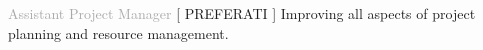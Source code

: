 



\begin{cvtable}


{\textcolor{darkgray}{Assistant Project Manager}}%
{[ {P\scriptsize REFERATI} ]}%
{%
Improving all aspects of project planning and resource management.
}


\end{cvtable}
